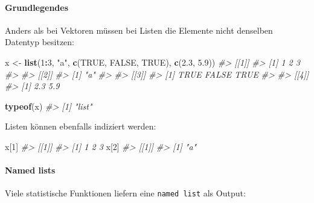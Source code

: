 \documentclass[
]{article}
\newenvironment{Shaded}{\begin{snugshade}}{\end{snugshade}}
\newcommand{\CommentTok}[1]{\textcolor[rgb]{0.56,0.35,0.01}{\textit{#1}}}
\newcommand{\ConstantTok}[1]{\textcolor[rgb]{0.56,0.35,0.01}{#1}}
\newcommand{\DecValTok}[1]{\textcolor[rgb]{0.00,0.00,0.81}{#1}}
\newcommand{\FloatTok}[1]{\textcolor[rgb]{0.00,0.00,0.81}{#1}}
\newcommand{\FunctionTok}[1]{\textcolor[rgb]{0.13,0.29,0.53}{\textbf{#1}}}
\newcommand{\NormalTok}[1]{#1}
\newcommand{\OtherTok}[1]{\textcolor[rgb]{0.56,0.35,0.01}{#1}}
\newcommand{\SpecialCharTok}[1]{\textcolor[rgb]{0.81,0.36,0.00}{\textbf{#1}}}
\newcommand{\StringTok}[1]{\textcolor[rgb]{0.31,0.60,0.02}{#1}}
\begin{document}
\hypertarget{grundlegendes-2}{%
\paragraph{Grundlegendes}\label{grundlegendes-2}}

Anders als bei Vektoren müssen bei Listen die Elemente nicht denselben
Datentyp besitzen:

\begin{Shaded}
\begin{Highlighting}[]
\NormalTok{x }\OtherTok{\textless{}{-}} \FunctionTok{list}\NormalTok{(}\DecValTok{1}\SpecialCharTok{:}\DecValTok{3}\NormalTok{, }\StringTok{"a"}\NormalTok{, }\FunctionTok{c}\NormalTok{(}\ConstantTok{TRUE}\NormalTok{, }\ConstantTok{FALSE}\NormalTok{, }\ConstantTok{TRUE}\NormalTok{), }\FunctionTok{c}\NormalTok{(}\FloatTok{2.3}\NormalTok{, }\FloatTok{5.9}\NormalTok{))}
\CommentTok{\#\textgreater{} [[1]]}
\CommentTok{\#\textgreater{} [1] 1 2 3}
\CommentTok{\#\textgreater{} }
\CommentTok{\#\textgreater{} [[2]]}
\CommentTok{\#\textgreater{} [1] "a"}
\CommentTok{\#\textgreater{} }
\CommentTok{\#\textgreater{} [[3]]}
\CommentTok{\#\textgreater{} [1]  TRUE FALSE  TRUE}
\CommentTok{\#\textgreater{} }
\CommentTok{\#\textgreater{} [[4]]}
\CommentTok{\#\textgreater{} [1] 2.3 5.9}

\FunctionTok{typeof}\NormalTok{(x)}
\CommentTok{\#\textgreater{} [1] "list"}
\end{Highlighting}
\end{Shaded}

Listen können ebenfalls indiziert werden:

\begin{Shaded}
\begin{Highlighting}[]
\NormalTok{x[}\DecValTok{1}\NormalTok{]}
\CommentTok{\#\textgreater{} [[1]]}
\CommentTok{\#\textgreater{} [1] 1 2 3}
\NormalTok{x[}\DecValTok{2}\NormalTok{]}
\CommentTok{\#\textgreater{} [[1]]}
\CommentTok{\#\textgreater{} [1] "a"}
\end{Highlighting}
\end{Shaded}

\hypertarget{named-lists}{%
\paragraph{Named lists}\label{named-lists}}

Viele statistische Funktionen liefern eine \texttt{named\ list} als
Output:
\end{document}
